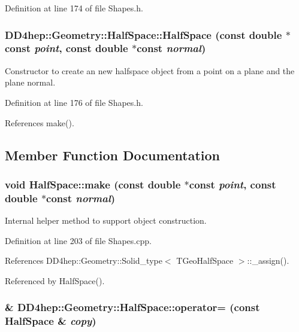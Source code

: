 Definition at line 174 of file Shapes.h.\hypertarget{class_d_d4hep_1_1_geometry_1_1_half_space_adf737484b3071ad3fe7a41f24af83d4b}{
\subsubsection[{HalfSpace}]{\setlength{\rightskip}{0pt plus 5cm}DD4hep::Geometry::HalfSpace::HalfSpace (const double $\ast$const  {\em point}, \/  const double $\ast$const  {\em normal})}}
\label{class_d_d4hep_1_1_geometry_1_1_half_space_adf737484b3071ad3fe7a41f24af83d4b}


Constructor to create an new halfspace object from a point on a plane and the plane normal. 

Definition at line 176 of file Shapes.h.

References make().

\subsection{Member Function Documentation}
\hypertarget{class_d_d4hep_1_1_geometry_1_1_half_space_abd2d6beb48210e1a9e29d6f16748b6dc}{
\subsubsection[{make}]{\setlength{\rightskip}{0pt plus 5cm}void HalfSpace::make (const double $\ast$const  {\em point}, \/  const double $\ast$const  {\em normal})}}
\label{class_d_d4hep_1_1_geometry_1_1_half_space_abd2d6beb48210e1a9e29d6f16748b6dc}


Internal helper method to support object construction. 

Definition at line 203 of file Shapes.cpp.

References DD4hep::Geometry::Solid\_\-type$<$ TGeoHalfSpace $>$::\_\-assign().

Referenced by HalfSpace().\hypertarget{class_d_d4hep_1_1_geometry_1_1_half_space_ab1c882102bd5a1e615ca7283253a3f01}{
\subsubsection[{operator=}]{\& DD4hep::Geometry::HalfSpace::operator= (const {\bf HalfSpace} \& {\em copy})}}
\label{class_d_d4hep_1_1_geometry_1_1_half_space_ab1c882102bd5a1e615ca7283253a3f01}


